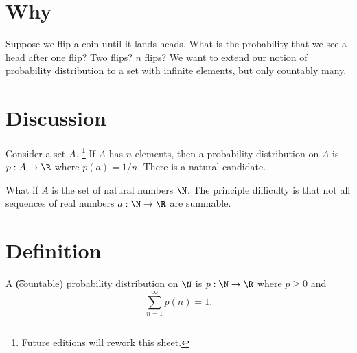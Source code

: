 
\section*{Why}

Suppose we flip a coin until it lands heads.
What is the probability that we see a head after one flip?
Two flips?
$n$ flips?
We want to extend our notion of probability distribution to a set with infinite elements, but only countably many.

\section*{Discussion}

Consider a set $A$.
  \ifhmode\unskip\fi\footnote{
Future editions will rework this sheet.
  }
If $A$ has $n$ elements, then a probability distribution on $A$ is $p: A \to \R $ where $p(a) = 1/n$.
There is a natural candidate.

What if $A$ is the set of natural numbers $\N $.
The principle difficulty is that not all sequences
of real numbers $a: \N  \to \R $ are summable.

\section*{Definition}

A \t{(countable) probability distribution} on $\N $ is $p: \N \to \R $ where $p \geq 0$ and
  \[
\textstyle
\sum_{n =1}^{\infty} p(n) = 1.
  \]

\blankpage